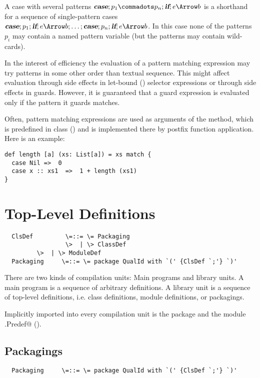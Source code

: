 \documentclass[11pt]{report}
\begin{document}
A case with several patterns $\CASE;p_1 \commadots p_n ;\IF; e \Arrow b$  is a
shorthand for a sequence of single-pattern cases $\CASE;p_1;\IF;e \Arrow b
;\ldots; \CASE;p_n ;\IF;e\Arrow b$. In this case none of the patterns
$p_i$ may contain a named pattern variable (but the patterns may contain
wild-cards).

In the interest of efficiency the evaluation of a pattern matching
expression may try patterns in some other order than textual
sequence. This might affect evaluation through side effects in
let-bound () selector expressions or through side
effects in guards. However, it is guaranteed that a guard expression
is evaluated only if the pattern it guards matches.


\example
Often, pattern matching expressions are used as arguments
of the \verb@match@ method, which is predefined in class \verb@Any@
() and is implemented there by postfix function
application. Here is an example:
\begin{verbatim}
def length [a] (xs: List[a]) = xs match {
  case Nil =>  0
  case x :: xs1  =>  1 + length (xs1)
}
\end{verbatim}

\chapter{Top-Level Definitions}
\label{sec:topdefs}

\syntax\begin{verbatim}
  ClsDef         \=::= \= Packaging
                 \>  | \> ClassDef
		 \>  | \> ModuleDef
  Packaging     \=::= \= package QualId with `(' {ClsDef `;'} `)'
\end{verbatim}

There are two kinds of compilation units: Main programs and library
units. A main program is a sequence of arbitrary definitions. A
library unit is a sequence of top-level definitions, i.e. class
definitions, module definitions, or packagings.

Implicitly imported into every compilation unit is the package
\verb@scala@ and the module \verb@scala.Predef@ ().

\section{Packagings}

\syntax\begin{verbatim}
  Packaging     \=::= \= package QualId with `(' {ClsDef `;'} `)'
\end{verbatim}
\end{document}
